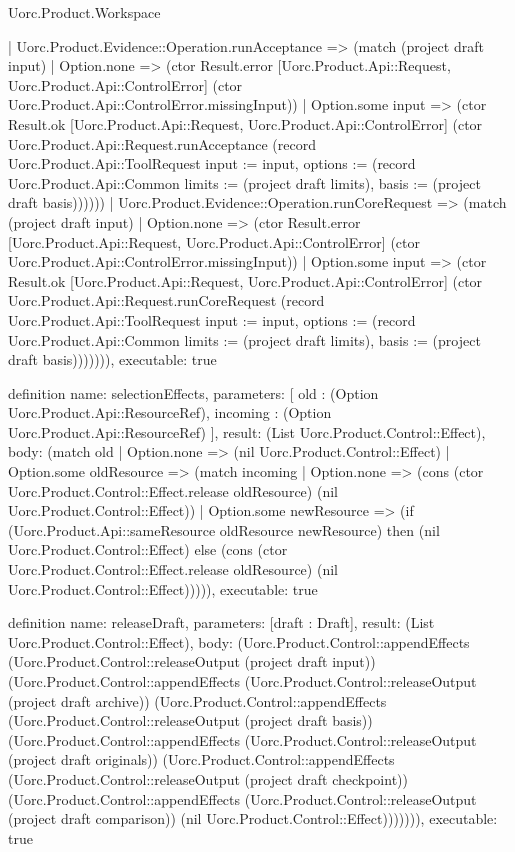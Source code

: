 \begin{lexlean}{Uorc.Product.Workspace}
\begin{semanticmodule}
{    | Uorc.Product.Evidence::Operation.runAcceptance => (match (project draft input)
      | Option.none => (ctor Result.error [Uorc.Product.Api::Request, Uorc.Product.Api::ControlError] (ctor Uorc.Product.Api::ControlError.missingInput))
      | Option.some input => (ctor Result.ok [Uorc.Product.Api::Request, Uorc.Product.Api::ControlError] (ctor Uorc.Product.Api::Request.runAcceptance (record Uorc.Product.Api::ToolRequest {input := input, options := (record Uorc.Product.Api::Common {limits := (project draft limits), basis := (project draft basis)})}))))
    | Uorc.Product.Evidence::Operation.runCoreRequest => (match (project draft input)
      | Option.none => (ctor Result.error [Uorc.Product.Api::Request, Uorc.Product.Api::ControlError] (ctor Uorc.Product.Api::ControlError.missingInput))
      | Option.some input => (ctor Result.ok [Uorc.Product.Api::Request, Uorc.Product.Api::ControlError] (ctor Uorc.Product.Api::Request.runCoreRequest (record Uorc.Product.Api::ToolRequest {input := input, options := (record Uorc.Product.Api::Common {limits := (project draft limits), basis := (project draft basis)})}))))),
  executable: true
}

definition{
  name: selectionEffects,
  parameters: [
    old : (Option Uorc.Product.Api::ResourceRef),
    incoming : (Option Uorc.Product.Api::ResourceRef)
  ],
  result: (List Uorc.Product.Control::Effect),
  body: (match old
    | Option.none => (nil Uorc.Product.Control::Effect)
    | Option.some oldResource => (match incoming
      | Option.none => (cons (ctor Uorc.Product.Control::Effect.release oldResource) (nil Uorc.Product.Control::Effect))
      | Option.some newResource => (if (Uorc.Product.Api::sameResource oldResource newResource) then (nil Uorc.Product.Control::Effect) else (cons (ctor Uorc.Product.Control::Effect.release oldResource) (nil Uorc.Product.Control::Effect))))),
  executable: true
}

definition{
  name: releaseDraft,
  parameters: [draft : Draft],
  result: (List Uorc.Product.Control::Effect),
  body: (Uorc.Product.Control::appendEffects (Uorc.Product.Control::releaseOutput (project draft input)) (Uorc.Product.Control::appendEffects (Uorc.Product.Control::releaseOutput (project draft archive)) (Uorc.Product.Control::appendEffects (Uorc.Product.Control::releaseOutput (project draft basis)) (Uorc.Product.Control::appendEffects (Uorc.Product.Control::releaseOutput (project draft originals)) (Uorc.Product.Control::appendEffects (Uorc.Product.Control::releaseOutput (project draft checkpoint)) (Uorc.Product.Control::appendEffects (Uorc.Product.Control::releaseOutput (project draft comparison)) (nil Uorc.Product.Control::Effect))))))),
  executable: true
}


\end{semanticmodule}
\end{lexlean}

